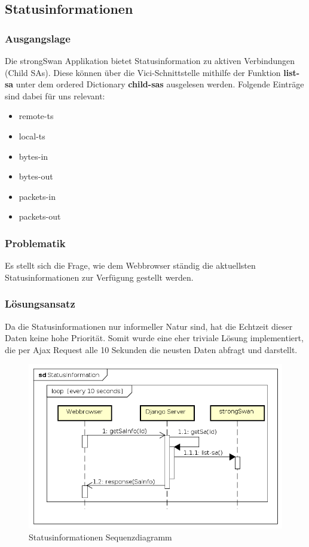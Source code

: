 \subsection{Statusinformationen}
\subsubsection{Ausgangslage}
Die strongSwan Applikation bietet Statusinformation zu aktiven Verbindungen (Child SAs). Diese können über die Vici-Schnittstelle mithilfe der Funktion \textbf{list-sa} unter dem ordered Dictionary \textbf{child-sas} ausgelesen werden. Folgende Einträge sind dabei für uns relevant:
\begin{itemize}
    \item remote-ts
    \item local-ts
    \item bytes-in
    \item bytes-out
    \item packets-in
    \item packets-out
\end{itemize}

\subsubsection{Problematik}
Es stellt sich die Frage, wie dem Webbrowser ständig die aktuellsten Statusinformationen zur Verfügung gestellt werden. 

\subsubsection{Lösungsansatz}
Da die Statusinformationen nur informeller Natur sind, hat die Echtzeit dieser Daten keine hohe Priorität. Somit wurde eine eher triviale Lösung implementiert, die per Ajax Request alle 10 Sekunden die neusten Daten abfragt und darstellt.
\begin{figure}[H]
\centering
\includegraphics[width=320pt]{images/StatusInformation.png}
\caption[Statusinformationen Sequenzdiagramm]{Statusinformationen Sequenzdiagramm}
\end{figure}

\newpage